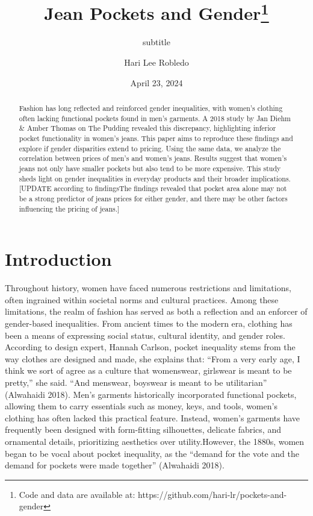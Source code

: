 \documentclass[
  letterpaper,
  DIV=11,
  numbers=noendperiod]{scrartcl}
\title{Jean Pockets and Gender\thanks{Code and data are available at:
https://github.com/hari-lr/pockets-and-gender}}
\subtitle{subtitle}
\author{Hari Lee Robledo}
\date{April 23, 2024}
\renewcommand*\contentsname{Table of contents}
\newcommand\contentsname{Table of contents}
\begin{document}
\maketitle
\begin{abstract}
Fashion has long reflected and reinforced gender inequalities, with
women's clothing often lacking functional pockets found in men's
garments. A 2018 study by Jan Diehm \& Amber Thomas on The Pudding
revealed this discrepancy, highlighting inferior pocket functionality in
women's jeans. This paper aims to reproduce these findings and explore
if gender disparities extend to pricing. Using the same data, we analyze
the correlation between prices of men's and women's jeans. Results
suggest that women's jeans not only have smaller pockets but also tend
to be more expensive. This study sheds light on gender inequalities in
everyday products and their broader implications. {[}UPDATE according to
findingsThe findings revealed that pocket area alone may not be a strong
predictor of jeans prices for either gender, and there may be other
factors influencing the pricing of jeans.{]}
\end{abstract}
\ifdefined\Shaded\renewenvironment{Shaded}{\begin{tcolorbox}[sharp corners, borderline west={3pt}{0pt}{shadecolor}, interior hidden, frame hidden, enhanced, boxrule=0pt, breakable]}{\end{tcolorbox}}\fi

\renewcommand*\contentsname{Table of contents}
{
\hypersetup{linkcolor=}
\setcounter{tocdepth}{3}
\tableofcontents
}
\newpage

\hypertarget{introduction}{%
\section{Introduction}\label{introduction}}

Throughout history, women have faced numerous restrictions and
limitations, often ingrained within societal norms and cultural
practices. Among these limitations, the realm of fashion has served as
both a reflection and an enforcer of gender-based inequalities. From
ancient times to the modern era, clothing has been a means of expressing
social status, cultural identity, and gender roles. According to design
expert, Hannah Carlson, pocket inequality stems from the way clothes are
designed and made, she explains that: ``From a very early age, I think
we sort of agree as a culture that womenswear, girlswear is meant to be
pretty,'' she said. ``And menswear, boyswear is meant to be
utilitarian'' (Alwahaidi 2018). Men's garments historically incorporated
functional pockets, allowing them to carry essentials such as money,
keys, and tools, women's clothing has often lacked this practical
feature. Instead, women's garments have frequently been designed with
form-fitting silhouettes, delicate fabrics, and ornamental details,
prioritizing aesthetics over utility.However, the 1880s, women began to
be vocal about pocket inequality, as the ``demand for the vote and the
demand for pockets were made together'' (Alwahaidi 2018).
\end{document}

